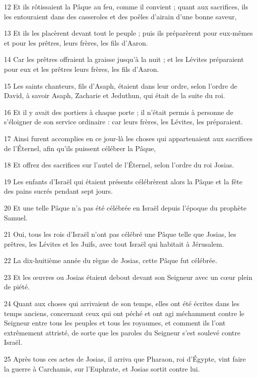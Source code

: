 \par 12 Et ils rôtissaient la Pâque au feu, comme il convient ; quant aux sacrifices, ils les entouraient dans des casseroles et des poêles d'airain d'une bonne saveur,
\par 13 Et ils les placèrent devant tout le peuple ; puis ils préparèrent pour eux-mêmes et pour les prêtres, leurs frères, les fils d'Aaron.
\par 14 Car les prêtres offraient la graisse jusqu'à la nuit ; et les Lévites préparaient pour eux et les prêtres leurs frères, les fils d'Aaron.
\par 15 Les saints chanteurs, fils d'Asaph, étaient dans leur ordre, selon l'ordre de David, à savoir Asaph, Zacharie et Jeduthun, qui était de la suite du roi.
\par 16 Et il y avait des portiers à chaque porte ; il n'était permis à personne de s'éloigner de son service ordinaire : car leurs frères, les Lévites, les préparaient.
\par 17 Ainsi furent accomplies en ce jour-là les choses qui appartenaient aux sacrifices de l'Éternel, afin qu'ils puissent célébrer la Pâque,
\par 18 Et offrez des sacrifices sur l'autel de l'Éternel, selon l'ordre du roi Josias.
\par 19 Les enfants d'Israël qui étaient présents célébrèrent alors la Pâque et la fête des pains sucrés pendant sept jours.
\par 20 Et une telle Pâque n'a pas été célébrée en Israël depuis l'époque du prophète Samuel.
\par 21 Oui, tous les rois d'Israël n'ont pas célébré une Pâque telle que Josias, les prêtres, les Lévites et les Juifs, avec tout Israël qui habitait à Jérusalem.
\par 22 La dix-huitième année du règne de Josias, cette Pâque fut célébrée.
\par 23 Et les œuvres ou Josias étaient debout devant son Seigneur avec un cœur plein de piété.
\par 24 Quant aux choses qui arrivaient de son temps, elles ont été écrites dans les temps anciens, concernant ceux qui ont péché et ont agi méchamment contre le Seigneur entre tous les peuples et tous les royaumes, et comment ils l'ont extrêmement attristé, de sorte que les paroles du Seigneur s'est soulevé contre Israël.
\par 25 Après tous ces actes de Josias, il arriva que Pharaon, roi d'Égypte, vint faire la guerre à Carchamis, sur l'Euphrate, et Josias sortit contre lui.
